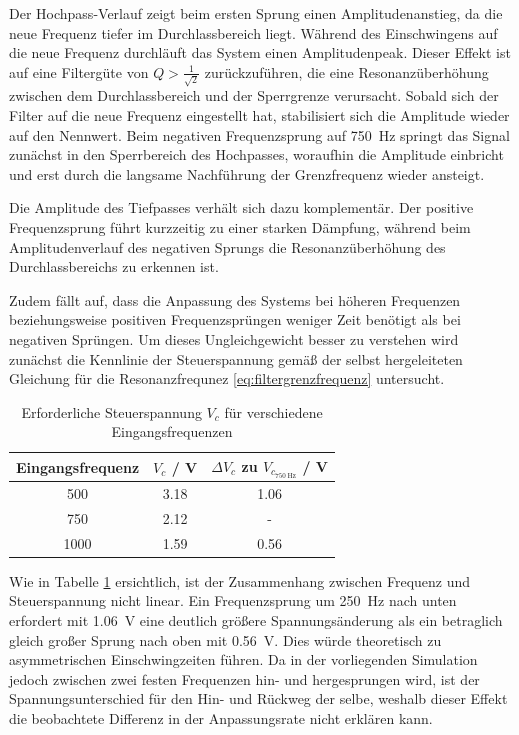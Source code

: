 \documentclass[../main_config.tex]{subfiles}
\begin{document}
Der Hochpass-Verlauf zeigt beim ersten Sprung einen Amplitudenanstieg, da die neue Frequenz tiefer im Durchlassbereich liegt. Während des Einschwingens auf die neue Frequenz durchläuft das System einen Amplitudenpeak. Dieser Effekt ist auf eine Filtergüte von $Q>\frac{1}{\sqrt{2}}$ zurückzuführen, die eine Resonanzüberhöhung zwischen dem Durchlassbereich und der Sperrgrenze verursacht. Sobald sich der Filter auf die neue Frequenz eingestellt hat, stabilisiert sich die Amplitude wieder auf den Nennwert. Beim negativen Frequenzsprung auf \SI{750}{\hertz} springt das Signal zunächst in den Sperrbereich des Hochpasses, woraufhin die Amplitude einbricht und erst durch die langsame Nachführung der Grenzfrequenz wieder ansteigt.\par
\medskip

Die Amplitude des Tiefpasses verhält sich dazu komplementär. Der positive Frequenzsprung führt kurzzeitig zu einer starken Dämpfung, während beim Amplitudenverlauf des negativen Sprungs die Resonanzüberhöhung des Durchlassbereichs zu erkennen ist. \par
\medskip

Zudem fällt auf, dass die Anpassung des Systems bei höheren Frequenzen beziehungsweise positiven Frequenzsprüngen weniger Zeit benötigt als bei negativen Sprüngen. Um dieses Ungleichgewicht besser zu verstehen wird zunächst die Kennlinie der Steuerspannung gemäß der selbst hergeleiteten Gleichung für die Resonanzfrequnez \ref{eq:filtergrenzfrequenz}  untersucht. \par
\medskip

\begin{table}[h]
    \centering
    \begin{tabular}{c|c|c}
        \textbf{Eingangsfrequenz} & \textbf{$V_c$ / \si{\volt}} & \textbf{$\Delta V_c$ zu $V_{c_{\SI{750}{\hertz}}}$ / \si{\volt}} \\ \hline
        500 & 3.18 & 1.06 \\
        750 & 2.12 & - \\
        1000 & 1.59 & 0.56 \\
    \end{tabular}
    \caption{Erforderliche Steuerspannung $V_c$ für verschiedene Eingangsfrequenzen}
    \label{tab:sim_einschwingzeit}
\end{table}

Wie in Tabelle \ref{tab:sim_einschwingzeit} ersichtlich, ist der Zusammenhang zwischen Frequenz und Steuerspannung nicht linear. Ein Frequenzsprung um \SI{250}{\hertz} nach unten erfordert mit \SI{1.06}{\volt} eine deutlich größere Spannungsänderung als ein betraglich gleich großer Sprung nach oben mit \SI{0.56}{\volt}. Dies würde theoretisch zu asymmetrischen Einschwingzeiten führen. Da in der vorliegenden Simulation jedoch zwischen zwei festen Frequenzen hin- und hergesprungen wird, ist der Spannungsunterschied für den Hin- und Rückweg der selbe, weshalb dieser Effekt die beobachtete Differenz in der Anpassungsrate nicht erklären kann.\par
\medskip
\end{document}
